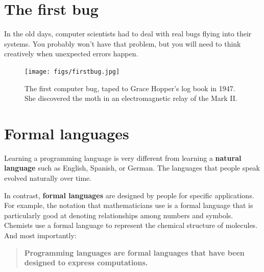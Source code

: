 \section{The first bug}

In the old days, computer scientists had to deal with real bugs flying into their systems.
You probably won't have that problem, but you will need to think creatively when unexpected errors happen.

\begin{figure}[!ht]
\begin{center}
\texttt{[image: figs/firstbug.jpg]}
\caption{The first computer bug, taped to Grace Hopper's log book in 1947.
\\ She discovered the moth in an electromagnetic relay of the Mark II.}
\end{center}
\end{figure}



\section{Formal languages}


Learning a programming language is very different from learning a {\bf natural language} such as English, Spanish, or German.
The languages that people speak evolved naturally over time.


In contrast, {\bf formal languages} are designed by people for specific applications.
For example, the notation that mathematicians use is a formal language that is particularly good at denoting relationships among numbers and symbols.
Chemists use a formal language to represent the chemical structure of molecules.
And most importantly:


\begin{quote}
{\bf Programming languages are formal languages that have been designed to express computations.}
\end{quote}

